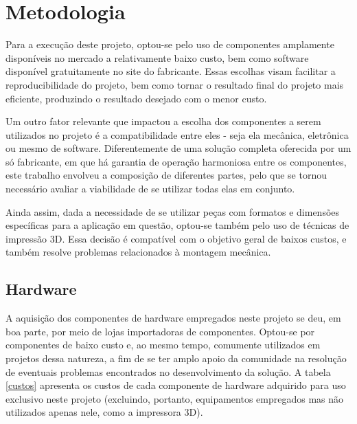
\chapter{Metodologia}

Para a execução deste projeto, optou-se pelo uso de componentes amplamente disponíveis no mercado a relativamente baixo
custo, bem como software disponível gratuitamente no site do fabricante. Essas escolhas visam facilitar a
reproducibilidade do projeto, bem como tornar o resultado final do projeto mais eficiente, produzindo o resultado
desejado com o menor custo. 

Um outro fator relevante que impactou a escolha dos componentes a serem utilizados no projeto é a compatibilidade entre
eles - seja ela mecânica, eletrônica ou mesmo de software. Diferentemente de uma solução completa oferecida por
um só fabricante, em que há garantia de operação harmoniosa entre os componentes, este trabalho envolveu a composição de
diferentes partes, pelo que se tornou necessário avaliar a viabilidade de se utilizar todas elas em conjunto.

Ainda assim, dada a necessidade de se utilizar peças com formatos e dimensões específicas para a aplicação em questão,
optou-se também pelo uso de técnicas de impressão 3D. Essa decisão é compatível com o objetivo geral de baixos custos, e
também resolve problemas relacionados à montagem mecânica.


\section{Hardware}
A aquisição dos componentes de hardware empregados neste projeto se deu, em boa parte, por meio de lojas importadoras de
componentes. Optou-se por componentes de baixo custo e, ao mesmo tempo, comumente utilizados em projetos dessa natureza,
a fim de se ter amplo apoio da comunidade na resolução de eventuais problemas encontrados no desenvolvimento da solução.
A tabela \ref{custos} apresenta os custos de cada componente de hardware adquirido para uso exclusivo neste projeto
(excluindo, portanto, equipamentos empregados mas não utilizados apenas nele, como a impressora 3D).


